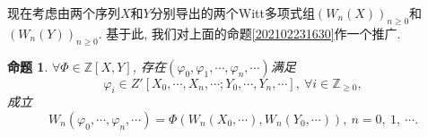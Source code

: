 \documentclass[UTF8, twoside]{ctexart}
\theoremstyle{nonumberplain}
\theoremstyle{nonumberplain}
\theoremstyle{plain}
\newtheorem{mingti}[dingyi]{命题}
\begin{document}
	现在考虑由两个序列$X$和$Y$分别导出的两个Witt多项式组${{\left( {{W}_{n}}\left( X \right) \right)}_{n\ge 0}}$和${{\left( {{W}_{n}}\left( Y \right) \right)}_{n\ge 0}}$. 基于此, 我们对上面的命题\ref{202102231630}作一个推广.
	\begin{mingti}	\label{202102231727}
		$\forall \Phi \in \mathbb{Z}\left[ X,Y \right]$, 存在$ \left( {{\varphi }_{0}},{{\varphi }_{1}},\cdots ,{{\varphi }_{n}},\cdots  \right)$满足
		\[
			{{\varphi }_{i}}\in Z'\left[ {{X}_{0}},\cdots ,{{X}_{n}},\cdots ;{{Y}_{0}},\cdots ,{{Y}_{n}},\cdots  \right],
			\ \forall i\in {{\mathbb{Z}}_{\ge 0}},
		\]
		成立
		\[
			{{W}_{n}}\left( {{\varphi }_{0}},\cdots ,{{\varphi }_{n}},\cdots  \right)=\Phi \left( {{W}_{n}}\left( {{X}_{0}},\cdots  \right),{{W}_{n}}\left( {{Y}_{0}},\cdots  \right) \right),\ n=0,\ 1,\ \cdots .
		\]
	\end{mingti}
\end{document}
